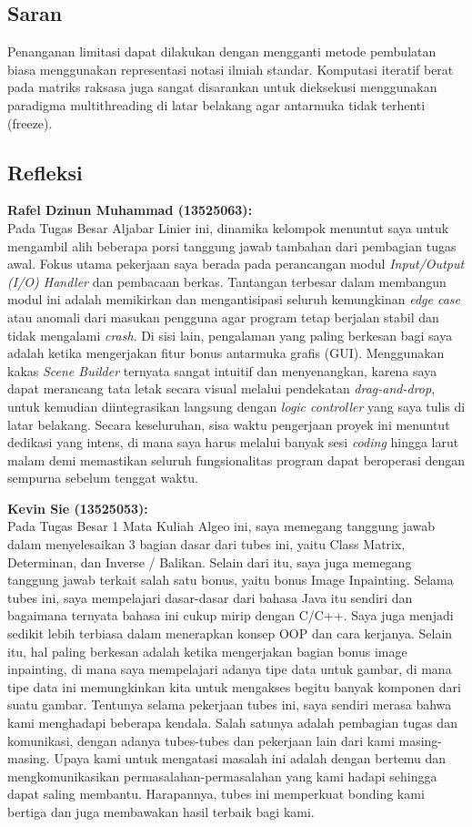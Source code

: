\documentclass[12pt, a4paper]{article}
\begin{document}
\subsection{Saran}
Penanganan limitasi dapat dilakukan dengan mengganti metode pembulatan biasa menggunakan representasi notasi ilmiah standar. Komputasi iteratif berat pada matriks raksasa juga sangat disarankan untuk dieksekusi menggunakan paradigma multithreading di latar belakang agar antarmuka tidak terhenti (freeze).

\subsection{Refleksi}
\textbf{Rafel Dzinun Muhammad (13525063):}\\
Pada Tugas Besar Aljabar Linier ini, dinamika kelompok menuntut saya untuk mengambil alih beberapa porsi tanggung jawab tambahan dari pembagian tugas awal. Fokus utama pekerjaan saya berada pada perancangan modul \textit{Input/Output (I/O) Handler} dan pembacaan berkas. Tantangan terbesar dalam membangun modul ini adalah memikirkan dan mengantisipasi seluruh kemungkinan \textit{edge case} atau anomali dari masukan pengguna agar program tetap berjalan stabil dan tidak mengalami \textit{crash}. Di sisi lain, pengalaman yang paling berkesan bagi saya adalah ketika mengerjakan fitur bonus antarmuka grafis (GUI). Menggunakan kakas \textit{Scene Builder} ternyata sangat intuitif dan menyenangkan, karena saya dapat merancang tata letak secara visual melalui pendekatan \textit{drag-and-drop}, untuk kemudian diintegrasikan langsung dengan \textit{logic controller} yang saya tulis di latar belakang. Secara keseluruhan, sisa waktu pengerjaan proyek ini menuntut dedikasi yang intens, di mana saya harus melalui banyak sesi \textit{coding} hingga larut malam demi memastikan seluruh fungsionalitas program dapat beroperasi dengan sempurna sebelum tenggat waktu.

\textbf{Kevin Sie (13525053):}\\
Pada Tugas Besar 1 Mata Kuliah Algeo ini, saya memegang tanggung jawab dalam menyelesaikan 3 bagian dasar dari tubes ini, yaitu Class Matrix, Determinan, dan Inverse / Balikan. Selain dari itu, saya juga memegang tanggung jawab terkait salah satu bonus, yaitu bonus Image Inpainting. Selama tubes ini, saya mempelajari dasar-dasar dari bahasa Java itu sendiri dan bagaimana ternyata bahasa ini cukup mirip dengan C/C++. Saya juga menjadi sedikit lebih terbiasa dalam menerapkan konsep OOP dan cara kerjanya. Selain itu, hal paling berkesan adalah ketika mengerjakan bagian bonus image inpainting, di mana saya mempelajari adanya tipe data untuk gambar, di mana tipe data ini memungkinkan kita untuk mengakses begitu banyak komponen dari suatu gambar. Tentunya selama pekerjaan tubes ini, saya sendiri merasa bahwa kami menghadapi beberapa kendala. Salah satunya adalah pembagian tugas dan komunikasi, dengan adanya tubes-tubes dan pekerjaan lain dari kami masing-masing. Upaya kami untuk mengatasi masalah ini adalah dengan bertemu dan mengkomunikasikan permasalahan-permasalahan yang kami hadapi sehingga dapat saling membantu. Harapannya, tubes ini memperkuat bonding kami bertiga dan juga membawakan hasil terbaik bagi kami.
\end{document}
